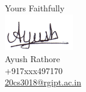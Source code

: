 \documentclass[letterpaper,12pt]{article}
\begin{document}

\vspace{0.5cm}
\raggedright
Yours Faithfully \\ {\vspace{-10pt}} \includegraphics[width=3cm]{sign.png} \\ Ayush Rathore \\ +917xxx497170\\ \href{mailto:youremail@email.com}{20cs3018@rgipt.ac.in}
\end{document}
